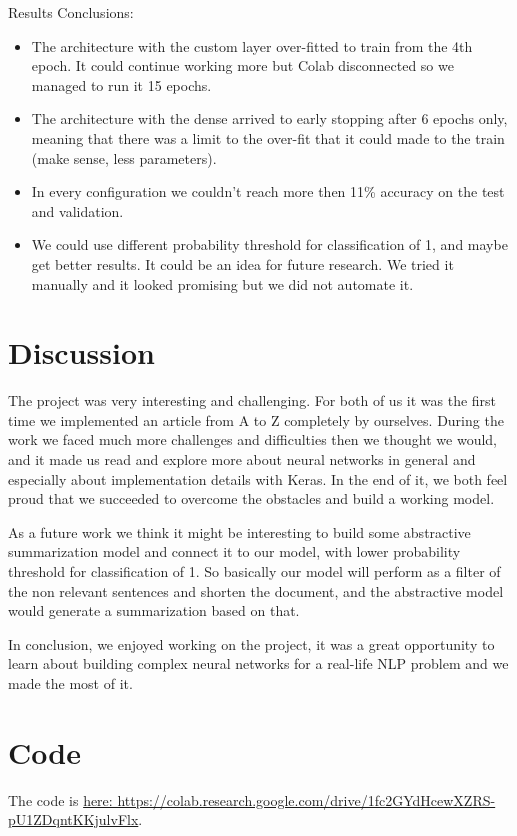 \documentclass{article}
\begin{document}
\begin{center}
\begin{tabular}{ |c|c|c|c|c| }
\end{tabular}
\end{center}

Results Conclusions:
\begin{itemize}
    \item The architecture with the custom layer over-fitted to train from the 4th epoch. It could continue working more but Colab disconnected so we managed to run it 15 epochs.
    \item The architecture with the dense arrived to early stopping after 6 epochs only, meaning that there was a limit to the over-fit that it could made to the train (make sense, less parameters).
    \item In every configuration we couldn't reach more then 11\% accuracy on the test and validation.
    \item We could use different probability threshold for classification of 1, and maybe get better results. It could be an idea for future research. We tried it manually and it looked promising but we did not automate it.
\end{itemize}

\section{Discussion}
The project was very interesting and challenging. For both of us it was the first time we implemented an article from A to Z completely by ourselves. During the work we faced much more challenges and difficulties then we thought we would, and it made us read and explore more about neural networks in general and especially about implementation details with Keras. In the end of it, we both feel proud that we succeeded to overcome the obstacles and build a working model.

As a future work we think it might be interesting to build some abstractive summarization model and connect it to our model, with lower probability threshold for classification of 1. So basically our model will perform as a filter of the non relevant sentences and shorten the document, and the abstractive model would  generate a summarization based on that.

In conclusion, we enjoyed working on the project, it was a great opportunity to learn about building complex neural networks for a real-life NLP problem and we made the most of it.

\section{Code}
The code is \href{https://colab.research.google.com/drive/1fc2GYdHcewXZRS-pU1ZDqntKKjulvFlx}{here: https://colab.research.google.com/drive/1fc2GYdHcewXZRS-pU1ZDqntKKjulvFlx}.


\end{document}
